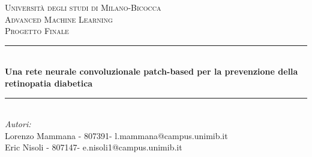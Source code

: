 \begin{titlepage}

\newcommand{\HRule}{\rule{\linewidth}{0.5mm}} %

\center %
 

\textsc{\LARGE Università degli studi di Milano-Bicocca}\\[1cm] %
\textsc{\Large Advanced Machine Learning }\\[0.3cm] %
\textsc{\large Progetto Finale}\\[0.1cm] %


\HRule \\[0.4cm]
{ \huge \bfseries Una rete neurale convoluzionale patch-based per la prevenzione della retinopatia diabetica}\\[0.4cm] %
\HRule \\[1.5cm]
 

\large
\emph{Autori:}\\
Lorenzo Mammana - 807391- l.mammana@campus.unimib.it \\   %
Eric Nisoli - 807147- e.nisoli1@campus.unimib.it   \\[1cm] %




\end{titlepage}

